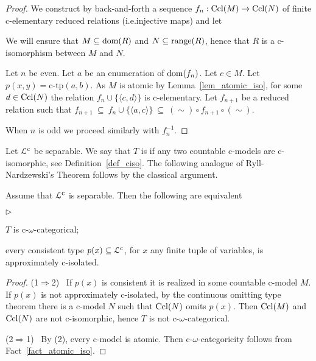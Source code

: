 \documentclass{amsproc}
\newcommand{\mylabel}[1]{{#1}\hfill}
\renewenvironment{itemize}
  {\begin{list}{$\triangleright$}{%
  \setlength{\parskip}{0mm}
  \setlength{\topsep}{.4\baselineskip}
  \setlength{\rightmargin}{0mm}
  \setlength{\listparindent}{0mm}
  \setlength{\itemindent}{0mm}
  \setlength{\labelwidth}{3ex}
  \setlength{\itemsep}{.2\baselineskip}
  \setlength{\parsep}{.2\baselineskip}
  \setlength{\partopsep}{0mm}
  \setlength{\labelsep}{1ex}
  \setlength{\leftmargin}{\labelwidth+\labelsep}
  \let\makelabel\mylabel}}{%
\end{list}}
\renewcommand*{\emph}[1]{%
   \smash{\tikz[baseline]\node[rectangle, fill=teal!25, rounded corners, inner xsep=0.5ex, inner ysep=0.2ex, anchor=base, minimum height = 2.7ex]{\strut #1};}}
\begin{document}
{\begin{proof}
  We construct by back-and-forth a sequence $f_n:{\rm Ccl}(M)\rightarrow{\rm Ccl}(N)$ of finite c-elementary reduced relations (i.e.\@ injective maps) and let 
  

  We will ensure that $M\subseteq{\rm dom}(R)$ and $N\subseteq{\rm range}(R)$, hence that $R$ is a c-isomorphism between $M$ and $N$.

  Let $n$ be even.
  Let $a$ be an enumeration of ${\rm dom}(f_n)$.
  Let $c\in M$.
  Let $p(x,y)=\mbox{c-tp}(a,b)$.
  As $M$ is atomic by Lemma~\ref{lem_atomic_iso}, for some $d\in{\rm Ccl}(N)$ the relation $f_n\cup\{\langle c,d\rangle\}$ is c-elementary.
  Let $f_{n+1}$ be a reduced relation such that $f_{n+1}\ \subseteq\ f_n\cup\{\langle a,c\rangle\}\ \subseteq\ (\sim)\circ f_{n+1}\circ(\sim)$.

  When $n$ is odd we proceed similarly with $f_n^{-1}$.
\end{proof}

Let ${\EuScript L}^{\rm c}$ be separable.
We say that $T$ is \emph{c-$\omega$-categorical\/} if any two countable c-models are c-isomorphic, see Definition~\ref{def_ciso}.
The following analogue of Ryll-Nardzewski's Theorem follows by the classical argument.

\begin{theorem}
  Assume that ${\EuScript L}^{\rm c}$ is separable.
  Then the following are equivalent
  \begin{itemize}
    \item[1.] $T$ is c-$\omega$-categorical;
    \item[2.] every consistent type $p(x)\subseteq{\EuScript L}^{\rm c}$, for $x$ any finite tuple of variables, is approximately c-isolated.
  \end{itemize}
\end{theorem}

\begin{proof}
  (1$\Rightarrow$2) \ 
  If $p(x)$ is consistent it is realized in some countable c-model $M$.
  If $p(x)$ is not approximately c-isolated, by the continuous omitting type theorem there is a c-model $N$ such that  ${\rm Ccl}(N)$ omits $p(x)$.
  Then ${\rm Ccl}(M)$ and ${\rm Ccl}(N)$ are not c-isomorphic, hence $T$ is not c-$\omega$-categorical.

  (2$\Rightarrow$1) \ 
  By (2), every c-model is atomic.
  Then c-$\omega$-categoricity follows from Fact~\ref{fact_atomic_iso}.
\end{proof}

}
\end{document}

